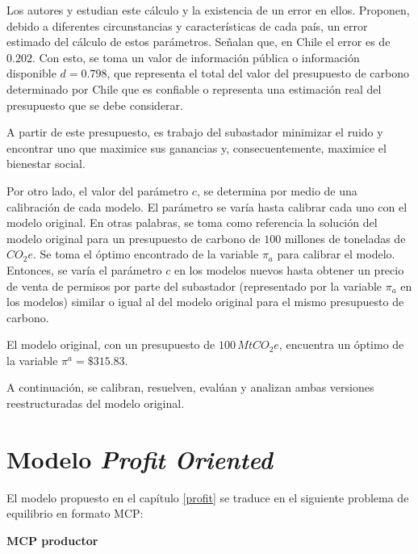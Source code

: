 Los autores  y  estudian este cálculo y la existencia de un error en ellos. Proponen, debido a diferentes circunstancias y características de cada país, un error estimado del cálculo de estos parámetros. Señalan que, en Chile el error es de $0.202$. Con esto, se toma un valor de información pública o información disponible $d=0.798$, que representa el total del valor del presupuesto de carbono determinado por Chile que es confiable o representa una estimación real del presupuesto que se debe considerar.   
\vspace{2.5mm}

A partir de este presupuesto, es trabajo del subastador minimizar el ruido y encontrar uno que maximice sus ganancias y, consecuentemente, maximice el bienestar social.
\vspace{2.5mm}

Por otro lado, el valor del parámetro $c$, se determina por medio de una calibración de cada modelo. El parámetro se varía hasta calibrar cada uno con el modelo original. En otras palabras, se toma como referencia la solución del modelo original para un presupuesto de carbono de $100$ millones de toneladas de $CO_{2}e$. Se toma el óptimo encontrado de la variable $\pi_a$ para calibrar el modelo. Entonces, se varía el parámetro $c$ en los modelos nuevos hasta obtener un precio de venta de permisos por parte del subastador (representado por la variable $\pi_a$ en los modelos) similar o igual al del modelo original para el mismo presupuesto de carbono.
\vspace{2.5mm}

El modelo original, con un presupuesto de $100\, MtCO_{2}e$, encuentra un óptimo de la variable $\pi^a= \$ 315.83$.
\vspace{2.5mm}

A continuación, se calibran, resuelven, evalúan y analizan ambas versiones reestructuradas del modelo original.

\section{Modelo \textit{Profit Oriented}} \label{resultadosprofit}

El modelo propuesto en el capítulo \ref{profit} se traduce en el siguiente problema de equilibrio en formato MCP: 

\textbf{MCP productor}

